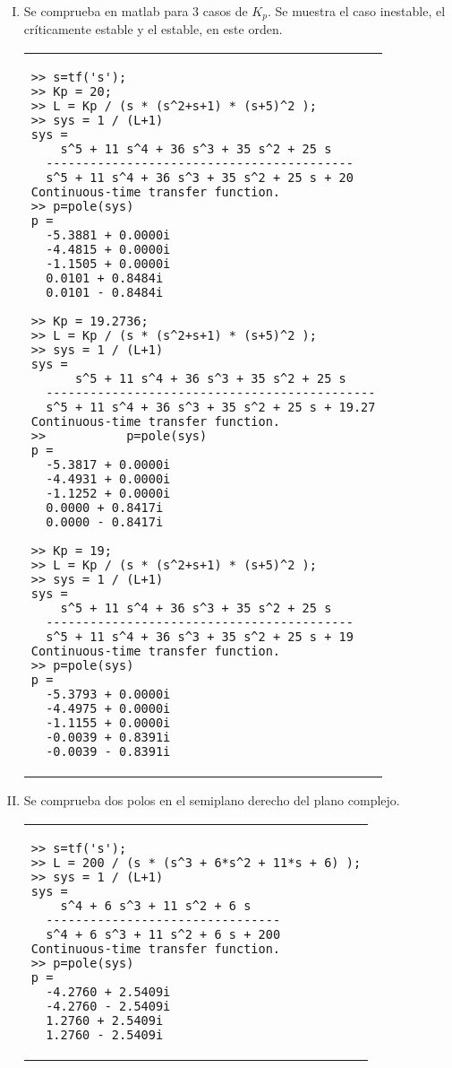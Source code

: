 \begin{ejercicio}
\begin{enumerate}
\begin{enumerate}[I.]
      \item
        Se comprueba en matlab para 3 casos de $K_p$. Se muestra el caso inestable, el críticamente estable y el estable, en este orden.
        \begin{center}
        \begin{tabular}{p{}}
        \toprule
          \begin{verbatim}
>> s=tf('s');
>> Kp = 20;
>> L = Kp / (s * (s^2+s+1) * (s+5)^2 );
>> sys = 1 / (L+1)
sys =
    s^5 + 11 s^4 + 36 s^3 + 35 s^2 + 25 s
  ------------------------------------------
  s^5 + 11 s^4 + 36 s^3 + 35 s^2 + 25 s + 20
Continuous-time transfer function.
>> p=pole(sys)
p =
  -5.3881 + 0.0000i
  -4.4815 + 0.0000i
  -1.1505 + 0.0000i
  0.0101 + 0.8484i
  0.0101 - 0.8484i

>> Kp = 19.2736;
>> L = Kp / (s * (s^2+s+1) * (s+5)^2 );
>> sys = 1 / (L+1)
sys =
      s^5 + 11 s^4 + 36 s^3 + 35 s^2 + 25 s
  ---------------------------------------------
  s^5 + 11 s^4 + 36 s^3 + 35 s^2 + 25 s + 19.27
Continuous-time transfer function.
>>           p=pole(sys)
p =
  -5.3817 + 0.0000i
  -4.4931 + 0.0000i
  -1.1252 + 0.0000i
  0.0000 + 0.8417i
  0.0000 - 0.8417i

>> Kp = 19;
>> L = Kp / (s * (s^2+s+1) * (s+5)^2 );
>> sys = 1 / (L+1)
sys =
    s^5 + 11 s^4 + 36 s^3 + 35 s^2 + 25 s
  ------------------------------------------
  s^5 + 11 s^4 + 36 s^3 + 35 s^2 + 25 s + 19
Continuous-time transfer function.
>> p=pole(sys)
p =
  -5.3793 + 0.0000i
  -4.4975 + 0.0000i
  -1.1155 + 0.0000i
  -0.0039 + 0.8391i
  -0.0039 - 0.8391i
          \end{verbatim}
        \bottomrule
      \end{tabular}
      \end{center}

      \item
        Se comprueba dos polos en el semiplano derecho del plano complejo.
        \begin{center}
        \begin{tabular}{p{}}
        \toprule
          \begin{verbatim}
>> s=tf('s');
>> L = 200 / (s * (s^3 + 6*s^2 + 11*s + 6) );
>> sys = 1 / (L+1)
sys =
    s^4 + 6 s^3 + 11 s^2 + 6 s
  --------------------------------
  s^4 + 6 s^3 + 11 s^2 + 6 s + 200
Continuous-time transfer function.
>> p=pole(sys)
p =
  -4.2760 + 2.5409i
  -4.2760 - 2.5409i
  1.2760 + 2.5409i
  1.2760 - 2.5409i
          \end{verbatim}
        \bottomrule
      \end{tabular}
      \end{center}


\end{enumerate}
\end{enumerate}
\end{ejercicio}
